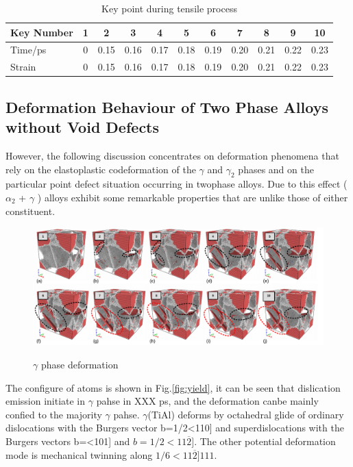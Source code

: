 \documentclass[journal,article,submit,moreauthors,pdftex,10pt,a4paper]{Definitions/mdpi}
\begin{document}
	\begin{table}[ht]
		\caption{Key point during tensile process}
		\centering
		\begin{tabular}{l c c c c c c c c c c}
		\toprule
		 \textbf{Key Number} & \textbf{1} & \textbf{2} & \textbf{3} & \textbf{4} & \textbf{5} & \textbf{6} & \textbf{7} & \textbf{8} & \textbf{9} & \textbf{10}\\
		\midrule
		Time/ps	& 0 & 0.15 & 0.16 & 0.17 & 0.18 & 0.19 & 0.20 & 0.21 & 0.22 & 0.23 \\
		\midrule
		Strain	& 0 & 0.15 & 0.16 & 0.17 & 0.18 & 0.19 & 0.20 & 0.21 & 0.22 & 0.23 \\
		\bottomrule
		\end{tabular} 
		\label{tab:key-pint}
	\end{table} 


\subsection{Deformation Behaviour of Two Phase Alloys without Void Defects}
However, the following discussion concentrates on deformation phenomena that rely on the elastoplastic codeformation of the $\gamma$ and $\gamma_2$ phases and on the particular point defect situation occurring in twophase alloys. Due to this effect ( $\alpha_2$ + $\gamma$ ) alloys exhibit some remarkable properties that are unlike those of either constituent.
\begin{figure}[ht]
		\centering
		\includegraphics[width=1\linewidth]{img/def-gamma}
		\label{fig:def-gamma}
		\caption{$\gamma$ phase deformation}
\end{figure}
The configure of atoms is shown in Fig.\ref{fig:yield}, it can be seen that dislication emission initiate in $\gamma$ pahse in XXX ps, and the deformation canbe mainly confied to the majority $\gamma$ pahse. $\gamma$(TiAl) deforms by octahedral glide of ordinary dislocations with the Burgers vector b=1/2<110] and superdislocations with the Burgers vectors b=<101] and $b=1/2<11\overline{2}]$. The other potential deformation mode is mechanical twinning along $1/6<11\overline{2}]{111}$.
\end{document}
